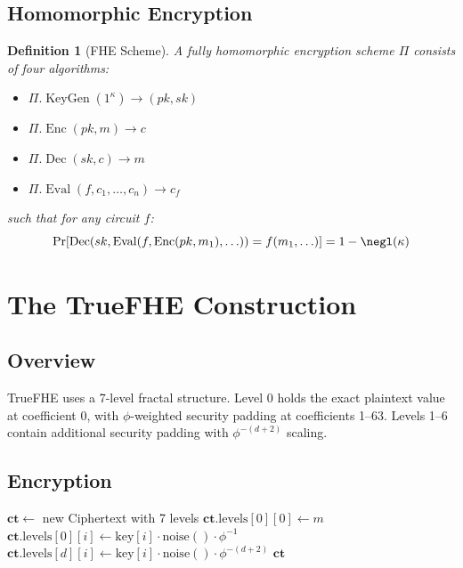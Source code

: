 \documentclass[11pt,a4paper]{article}
\newtheorem{definition}[theorem]{Definition}
\theoremstyle{remark}
\DeclareMathOperator{\Enc}{Enc}
\DeclareMathOperator{\Dec}{Dec}
\DeclareMathOperator{\Eval}{Eval}
\DeclareMathOperator{\KeyGen}{KeyGen}
\begin{document}
\subsection{Homomorphic Encryption}

\begin{definition}[FHE Scheme]
A fully homomorphic encryption scheme $\Pi$ consists of four algorithms:
\begin{itemize}
    \item $\Pi.\KeyGen(1^\kappa) \to (pk, sk)$
    \item $\Pi.\Enc(pk, m) \to c$
    \item $\Pi.\Dec(sk, c) \to m$
    \item $\Pi.\Eval(f, c_1, \ldots, c_n) \to c_f$
\end{itemize}
such that for any circuit $f$:
\begin{equation}
    \Pr[\Dec(sk, \Eval(f, \Enc(pk, m_1), \ldots)) = f(m_1, \ldots)] = 1 - \negl(\kappa)
\end{equation}
\end{definition}

\section{The TrueFHE Construction}

\subsection{Overview}

TrueFHE uses a 7-level fractal structure. Level 0 holds the exact plaintext value at coefficient 0, with $\phi$-weighted security padding at coefficients 1--63. Levels 1--6 contain additional security padding with $\phi^{-(d+2)}$ scaling.

\subsection{Encryption}

\begin{algorithm}[H]
\caption{$\Enc(m)$ — TrueFHE Encryption}
\begin{algorithmic}[1]
\State $\mathbf{ct} \gets$ new Ciphertext with 7 levels
\State $\mathbf{ct}.\text{levels}[0][0] \gets m$ 
    \State $\mathbf{ct}.\text{levels}[0][i] \gets \text{key}[i] \cdot \text{noise}() \cdot \phi^{-1}$
\EndFor
{}
        \State $\mathbf{ct}.\text{levels}[d][i] \gets \text{key}[i] \cdot \text{noise}() \cdot \phi^{-(d+2)}$
    \EndFor
\EndFor
\State \Return $\mathbf{ct}$
\end{algorithmic}
\end{algorithm}
\end{document}
